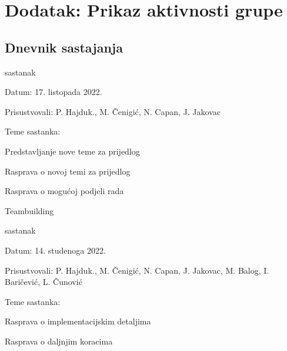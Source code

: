 \chapter*{Dodatak: Prikaz aktivnosti grupe}
		
		\section*{Dnevnik sastajanja}
		
		
		
		\begin{packed_enum}
			\item  sastanak
			
			\item[] \begin{packed_item}
				\item Datum: 17. listopada 2022.
				\item Prisustvovali: P. Hajduk., M. Čenigić, N. Capan, J. Jakovac
				\item Teme sastanka:
				\begin{packed_item}
					\item  Predstavljanje nove teme za prijedlog
					\item  Rasprava o novoj temi za prijedlog
					\item  Rasprava o mogućoj podjeli rada
					\item  Teambuilding
				\end{packed_item}
			\end{packed_item}
			
			\item  sastanak
			\item[] \begin{packed_item}
				\item Datum: 14. studenoga 2022.
				\item Prisustvovali: P. Hajduk., M. Čenigić, N. Capan, J. Jakovac, M. Balog, I. Baričević, L. Čunović
				\item Teme sastanka:
				\begin{packed_item}
					\item  Rasprava o implementacijskim detaljima
					\item  Rasprava o daljnjim koracima
				\end{packed_item}
			\end{packed_item}
			
			
		\end{packed_enum}
		
